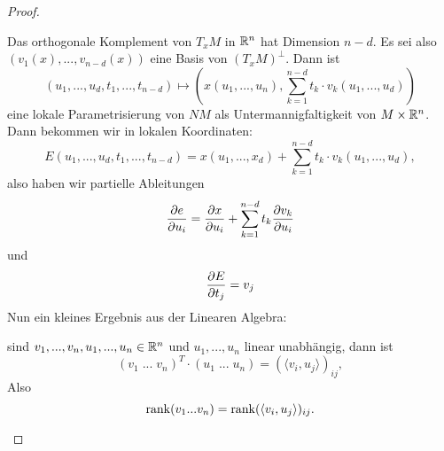 \begin{proof}
    \begin{smallproof}
        Das orthogonale Komplement von $T_xM$ in $\R^n$ hat Dimension $n - d$. Es sei also 
        $(v_1(x), ..., v_{n-d}(x))$ eine Basis von $(T_xM)^{\perp}$. Dann ist 
        \[ (u_1, ..., u_d, t_1, ..., t_{n - d}) \longmapsto 
            \left(x(u_1, ..., u_n), \sum_{k = 1}^{n - d} t_k \cdot v_k(u_1, ..., u_d)\right) \]
        eine lokale Parametrisierung von $NM$ als Untermannigfaltigkeit von $M \times \R^n$. Dann 
        bekommen wir in lokalen Koordinaten:
        \[ E (u_1, ..., u_d, t_1, ..., t_{n - d}) = x(u_1, ..., x_d) 
        + \sum_{k = 1}^{n - d} t_k \cdot v_k (u_1, ..., u_d) , \]
        also haben wir partielle Ableitungen
        \[ \pderive[e]{u_i} = \pderive[x]{u_i} + \sum_{k = 1}^{n - d} t_k \pderive[v_k]{u_i} \]
        und 
        \[ \pderive[E]{t_j} = v_j \]
        Nun ein kleines Ergebnis aus der Linearen Algebra:

        sind $v_1, ..., v_n, u_1, ..., u_n \in \R^n$ und $u_1, ..., u_n$ linear unabhängig, 
        dann ist
        \[ (v_1 \; ... \; v_n)^T \cdot (u_1 \; ... \; u_n) = (\langle v_i, u_j \rangle)_{ij} , \]
        Also 
        \[ \rank (v_1 ... v_n) = \rank (\langle v_i, u_j \rangle)_{ij} . \]


\end{smallproof}
\end{proof}
